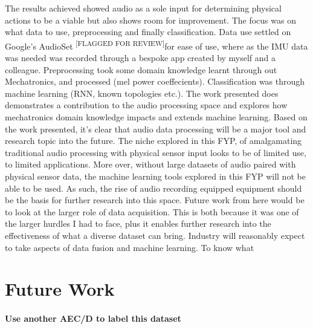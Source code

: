 \documentclass{UoNMCHA}
\newcommand{\flagforreview}{\textsuperscript{\color{red} [FLAGGED FOR REVIEW]}}
\numberwithin{equation}{section}
\begin{document}
The results achieved showed audio as a sole input for determining physical actions to be a viable but also shows room for improvement. The focus was on what data to use, preprocessing and finally classification. 
Data use settled on Google's AudioSet \flagforreview for ease of use, where as the IMU data was needed was recorded through a bespoke app created by myself and a colleague. Preprocessing took some domain knowledge learnt through out Mechatronics, and processed (mel power coeffecients). Classification was through machine learning (RNN, known topologies etc.). 
The work presented does demonstrates a contribution to the audio processing space and explores how mechatronics domain knowledge impacts and extends machine learning.
Based on the work presented, it's clear that audio data processing will be a major tool and research topic into the future. The niche explored in this FYP, of amalgamating traditional audio processing with physical sensor input looks to be of limited use, to limited applications. More over, without large datasets of audio paired with physical sensor data, the machine learning tools explored in this FYP will not be able to be used. As such, the rise of audio recording equipped equipment should be the basis for further research into this space. 
Future work from here would be to look at the larger role of data acquisition. This is both because it was one of the larger hurdles I had to face, plus it enables further research into the effectiveness of what a diverse dataset can bring. Industry will reasonably expect to take aspects of data fusion and machine learning. To know what

\section{Future Work}
\paragraph{Use another AEC/D to label this dataset}
\end{document}
